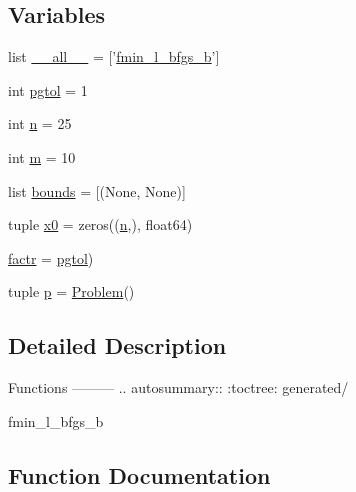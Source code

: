 \subsection*{Variables}
\begin{DoxyCompactItemize}
\item 
list \hyperlink{namespacescipy_1_1optimize_1_1lbfgsb_a5b8bdf3ddc383abc3498e61d5004f746}{\+\_\+\+\_\+all\+\_\+\+\_\+} = \mbox{[}'\hyperlink{namespacescipy_1_1optimize_1_1lbfgsb_aef8d649e45fd180967818ac9e8c35c5c}{fmin\+\_\+l\+\_\+bfgs\+\_\+b}'\mbox{]}
\item 
int \hyperlink{namespacescipy_1_1optimize_1_1lbfgsb_aa4981973ec364e19f1b35f31bff58693}{pgtol} = 1
\item 
int \hyperlink{namespacescipy_1_1optimize_1_1lbfgsb_a629de846ab6929bd165a5f48d2f8f82d}{n} = 25
\item 
int \hyperlink{namespacescipy_1_1optimize_1_1lbfgsb_aa8d728249f11931cff01c945bbaf668e}{m} = 10
\item 
list \hyperlink{namespacescipy_1_1optimize_1_1lbfgsb_a4edd568c4b1a1d384729a2b7b2a777d2}{bounds} = \mbox{[}(None, None)\mbox{]}
\item 
tuple \hyperlink{namespacescipy_1_1optimize_1_1lbfgsb_a563527e71404a7c467540bc91ce9bf24}{x0} = zeros((\hyperlink{namespacescipy_1_1optimize_1_1lbfgsb_a629de846ab6929bd165a5f48d2f8f82d}{n},), float64)
\item 
\hyperlink{namespacescipy_1_1optimize_1_1lbfgsb_abc96c3036bc9c1364492a91ec4ddd52b}{factr} = \hyperlink{namespacescipy_1_1optimize_1_1lbfgsb_aa4981973ec364e19f1b35f31bff58693}{pgtol})
\item 
tuple \hyperlink{namespacescipy_1_1optimize_1_1lbfgsb_a011248dd8389fc02db79e97e9341b120}{p} = \hyperlink{classscipy_1_1optimize_1_1lbfgsb_1_1Problem}{Problem}()
\end{DoxyCompactItemize}


\subsection{Detailed Description}
\begin{DoxyVerb}Functions
---------
.. autosummary::
   :toctree: generated/

fmin_l_bfgs_b\end{DoxyVerb}
 

\subsection{Function Documentation}
\hypertarget{namespacescipy_1_1optimize_1_1lbfgsb_aef8d649e45fd180967818ac9e8c35c5c}{}
